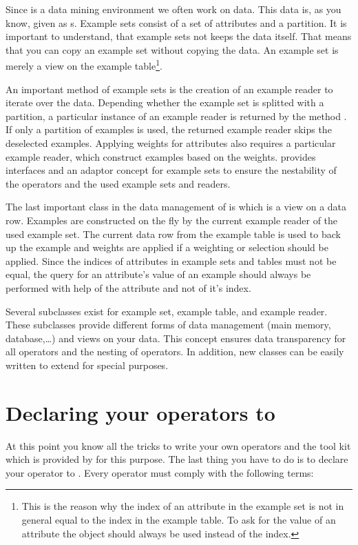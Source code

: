 Since \rapidminer is a data mining environment we often work on data. This
data is, as you know, given as s. Example sets
consist of a set of attributes and a partition. It is important to
understand, that example sets not keeps the data itself. That means
that you can copy an example set without copying the data. An example
set is merely a view on the example table\footnote{This is the reason
  why the index of an attribute in the example set is not in general
  equal to the index in the example table. To ask for the value of an
  attribute the  object should always be used instead
  of the index.}.

An important method of example sets is the creation of an example
reader to iterate over the data. Depending whether the example set is
splitted with a partition, a particular instance of an example reader
is returned by the method . If only a
partition of examples is used, the returned example reader skips the
deselected examples. Applying weights
for attributes also requires a particular example reader, which
construct examples based on the weights. \rapidminer provides interfaces and
an adaptor concept for example sets to ensure the nestability of the
operators and the used example sets and readers.

The last important class in the data management of \rapidminer is
 which is a view on a data row. Examples are constructed
on the fly by the current example reader of the used example set. The
current data row from the example table is used to back up the example
and weights are applied if a weighting or selection should be
applied. Since the indices of attributes in example sets and tables
must not be equal, the query for an attribute's value of an example
should always be performed with help of the attribute and not of it's
index.

Several subclasses exist for example set, example table, and example
reader. These subclasses provide different forms of data management
(main memory, database,\ldots) and views on your data. This concept ensures
data transparency for all operators and the nesting of operators. In
addition, new classes can be easily written to extend \rapidminer for
special purposes.





\section{Declaring your operators to \rapidminer}
\label{sec:op:declaring_operators}
At this point you know all the tricks to write your own operators and
the tool kit which is provided by \rapidminer for this purpose. The last
thing you have to do is to declare your operator to \rapidminer. Every
operator must comply with the following terms:

